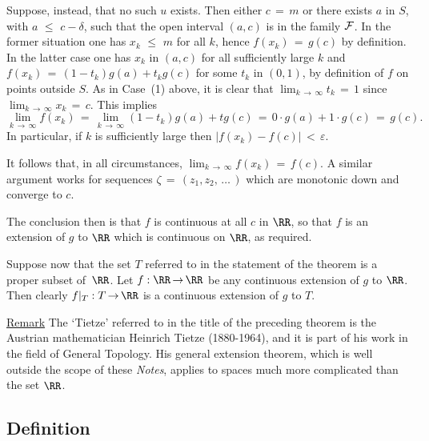         Suppose, instead, that no such $u$ exists. Then either $c \,=\, m$
    or there exists $a$ in $S$, with $a\,\,{\leq}\,\,c-{\delta}$, such that the open interval $(a,c)$ is in the family ${\cal F}$.
    In the former situation one has $x_{k}\,\,{\leq}\,\,m$ for all $k$, hence $f(x_{k}) \,=\, g(c)$ by definition.
    In the latter case one has $x_{k}$ in $(a,c)$ for all sufficiently large $k$ and $f(x_{k}) \,=\, (1-t_{k})g(a)+t_{k}g(c)$ for some $t_{k}$ in $(0,1)$, by definition of $f$ on points outside $S$.
    As in Case~(1) above, it is clear that $\lim_{k \,{\rightarrow}\, {\infty}} t_{k} \,=\, 1$ since $\lim_{k \,{\rightarrow}\, {\infty}} x_{k} \,=\, c$.
    This implies
        \begin{displaymath}
        \lim_{k \,{\rightarrow}\, {\infty}} f(x_{k}) \,=\, \lim_{k \,{\rightarrow}\, {\infty}} (1-t_{k})g(a) + tg(c) \,=\, 0{\cdot}g(a)+1{\cdot}g(c) \,=\, g(c).
        \end{displaymath}
    In particular, if $k$ is sufficiently large then $|f(x_{k})-f(c)|\,<\,{\varepsilon}$.

        It follows that, in all circumstances, $\lim_{k \,{\rightarrow}\, {\infty}} f(x_{k}) \,=\, f(c)$.
    A similar argument works for sequences ${\zeta} \,=\, (z_{1},z_{2},\,{\ldots}\,)$ which are monotonic down and converge to $c$.

\V

        The conclusion then is that $f$ is continuous at all $c$ in ${\RR}$, so that $f$ is an extension of $g$ to ${\RR}$ which is continuous on ${\RR}$, as required.

\V

        Suppose now that the set $T$ referred to in the statement of the theorem is a proper subset of~${\RR}$.
    Let $f:{\RR} \,{\rightarrow}\, {\RR}$ be any continuous extension of $g$ to ${\RR}$.
    Then clearly $f|_{T}:T \,{\rightarrow}\, {\RR}$ is a continuous extension of $g$ to $T$.

\V

        \underline{Remark} The `Tietze' referred to in the title of the preceding theorem is the Austrian mathematician Heinrich Tietze (1880-1964), and it is part of his work in the field of General Topology.
    His general extension theorem, which is well outside the scope of these {\em Notes}, applies to spaces much more complicated than the set ${\RR}$.

\V

            \subsection{\small{\bf Definition}}
            \label{DefF20.30}

